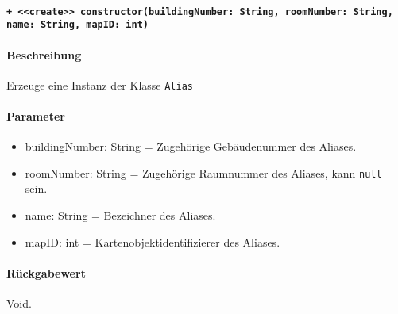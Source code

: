 \paragraph{\texttt{+ <<create>> constructor(buildingNumber: String, roomNumber: String, name: String, mapID: int)}}\label{AP_Alias_constructor}%
\paragraph*{Beschreibung}
Erzeuge eine Instanz der Klasse \verb#Alias#
\paragraph*{Parameter}
\begin{itemize}
    \item buildingNumber: String = Zugehörige Gebäudenummer des Aliases.
    \item roomNumber: String = Zugehörige Raumnummer des Aliases, kann \verb#null# sein.
    \item name: String = Bezeichner des Aliases.
    \item mapID: int = Kartenobjektidentifizierer des Aliases.
\end{itemize}
\paragraph*{Rückgabewert}
Void.